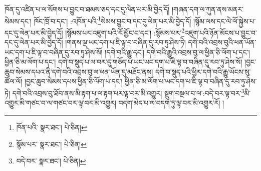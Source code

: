 ཁོན་དུ་འཛིན་པ་ལ་སོགས་པ་བྱུང་བ་ཐམས་ཅད་དང་དུ་ལེན་པར་མི་བྱེད་དོ། །གཞན་དག་ལ་ཀུན་ནས་མནར་སེམས་དང་། ཁོང་ཁྲོ་བ་དང་། :འཁོན་པའི་\footnote{ཁོན་པའི་  སྣར་ཐང་།  པེ་ཅིན། }སེམས་བྱུང་བ་དང་དུ་ལེན་པར་མི་བྱེད་དོ། །སྙོམ་ལས་དང་ལེ་ལོ་སྐྱེས་པ་དང་དུ་ལེན་པར་མི་བྱེད་དོ། །སྙོམས་པར་འཇུག་པའི་རོ་མྱོང་བ་དང་། :སྙོམས་པར་\footnote{སྙོམ་པར་  སྣར་ཐང་།  པེ་ཅིན། }འཇུག་པའི་ཉོན་མོངས་པ་བྱུང་བ་དང་དུ་ལེན་པར་མི་བྱེད་དོ། །གནས་ལྔ་ཡང་དག་པ་ཇི་ལྟ་བ་བཞིན་དུ་རབ་ཏུ་ཤེས་ཏེ། དགེ་བའི་འབྲས་བུའི་ཕན་ཡོན་ཡང་དག་པ་ཇི་ལྟ་བ་བཞིན་དུ་རབ་ཏུ་ཤེས་སོ། །དགེ་བའི་རྒྱུ་དང་། དགེ་བའི་རྒྱུའི་འབྲས་བུ་ལ་ཕྱིན་ཅི་ལོག་པ་དང་། ཕྱིན་ཅི་མ་ལོག་པ་དང་། དགེ་བ་སྡུད་པ་ལ་བར་དུ་གཅོད་པ་ཡང་ཡང་དག་པ་ཇི་ལྟ་བ་བཞིན་དུ་རབ་ཏུ་ཤེས་སོ། །བྱང་ཆུབ་སེམས་དཔའ་ནི་དགེ་བའི་འབྲས་བུ་ལ་ཕན་ཡོན་དུ་མཐོང་ནས། དགེ་བ་སྡུད་པའི་ཕྱིར་དགེ་བའི་རྒྱུ་ཡོངས་སུ་ཚོལ་ལོ། །བྱང་ཆུབ་སེམས་དཔས་ཕྱིན་ཅི་ལོག་པ་དང་། ཕྱིན་ཅི་མ་ལོག་པ་ཡང་དག་པ་ཇི་ལྟ་བ་བཞིན་དུ་རབ་ཏུ་ཤེས་ཏེ། དགེ་བའི་འབྲས་བུ་ཐོབ་ནས་མི་རྟག་པ་ལ་རྟག་པར་ལྟ་བར་མི་འགྱུར། སྡུག་བསྔལ་བ་ལ་:བདེ་བར་ལྟ་བར་\footnote{བདེ་བར་  སྣར་ཐང་།  པེ་ཅིན། }མི་འགྱུར་མི་གཙང་བ་ལ་གཙང་བར་ལྟ་བར་མི་འགྱུར། བདག་མེད་པ་ལ་བདག་ཏུ་ལྟ་བར་མི་འགྱུར་རོ། །
